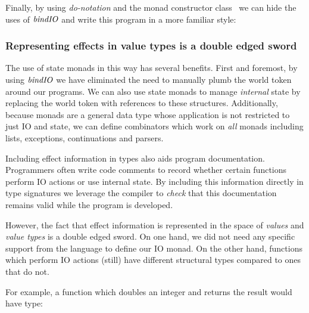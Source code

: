 
Finally, by using \emph{do-notation} and the monad constructor class~\cite{jones:constructor-classes} we can hide the uses of $\operatorname{\mathit{bindIO}}$ and write this program in a more familiar style:




\subsubsection{Representing effects in value types is a double edged sword}

The use of state monads in this way has several benefits. First and foremost, by using $\operatorname{\mathit{bindIO}}$ we have eliminated the need to manually plumb the world token around our programs. We can also use state monads to manage \emph{internal} state by replacing the world token with references to these structures.  Additionally, because monads are a general data type whose application is not restricted to just IO and state, we can define combinators which work on \emph{all} monads including lists, exceptions, continuations and parsers.

Including effect information in types also aids program documentation. Programmers often write code comments to record whether certain functions perform IO actions or use internal state. By including this information directly in type signatures we leverage the compiler to \emph{check} that this documentation remains valid while the program is developed.

However, the fact that effect information is represented in the space of \emph{values} and \emph{value types} is a double edged sword. On one hand, we did not need any specific support from the language to define our IO monad. On the other hand, functions which perform IO actions (still) have different structural types compared to ones that do not. 

For example, a function which doubles an integer and returns the result would have type:

